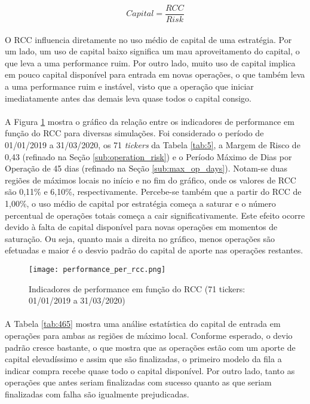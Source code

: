 \begin{equation} \label{eq:61}
    Capital = \dfrac{RCC}{Risk}
\end{equation}

\paragraph{} O RCC influencia diretamente no uso médio de capital de uma estratégia. Por um lado, um uso de capital baixo significa um mau aproveitamento do capital, o que leva a uma performance ruim. Por outro lado, muito uso de capital implica em pouco capital disponível para entrada em novas operações, o que também leva a uma performance ruim e instável, visto que a operação que iniciar imediatamente antes das demais leva quase todos o capital consigo.

\paragraph{} A Figura \ref{fig:550} mostra o gráfico da relação entre os indicadores de performance em função do RCC para diversas simulações. Foi considerado o período de 01/01/2019 a 31/03/2020, os 71 \textit{tickers} da Tabela \ref{tab:5}, a Margem de Risco de 0,43 (refinado na Seção \ref{sub:operation_risk}) e o Período Máximo de Dias por Operação de 45 dias (refinado na Seção \ref{sub:max_op_days}). Notam-se duas regiões de máximos locais no início e no fim do gráfico, onde os valores de RCC são 0,11\% e 6,10\%, respectivamente. Percebe-se também que a partir do RCC de 1,00\%, o uso médio de capital por estratégia começa a saturar e o número percentual de operações totais começa a cair significativamente. Este efeito ocorre devido à falta de capital disponível para novas operações em momentos de saturação. Ou seja, quanto mais a direita no gráfico, menos operações são efetuadas e maior é o desvio padrão do capital de aporte nas operações restantes.

\begin{figure}[!htb]
    \texttt{[image: performance\_per\_rcc.png]}
    \centering
    \caption{Indicadores de performance em função do RCC (71 tickers: 01/01/2019 a 31/03/2020)}
    \label{fig:550}
\end{figure}

\paragraph{} A Tabela \ref{tab:465} mostra uma análise estatística do capital de entrada em operações para ambas as regiões de máximo local. Conforme esperado, o devio padrão cresce bastante, o que mostra que as operações estão com um aporte de capital elevadíssimo e assim que são finalizadas, o primeiro modelo da fila a indicar compra recebe quase todo o capital disponível. Por outro lado, tanto as operações que antes seriam finalizadas com sucesso quanto as que seriam finalizadas com falha são igualmente prejudicadas.

